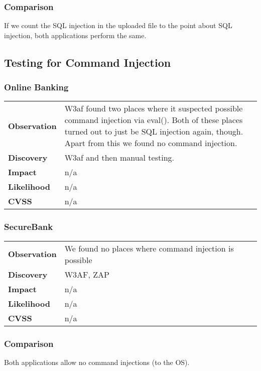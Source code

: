 \subsubsection*{Comparison}
If we count the SQL injection in the uploaded file to the point about SQL injection, both applications perform the same.

\clearpage


\subsection{Testing for Command Injection}

\subsubsection*{Online Banking}

\begin{tabular}{l|p{10cm}}
\textbf{Observation} & W3af found two places where it suspected possible command injection via eval(). Both of these places turned out to just be SQL injection again, though. Apart from this we found no command injection.\\
\textbf{Discovery} & W3af and then manual testing.\\
\textbf{Impact} & n/a \\
\textbf{Likelihood} & n/a \\
\textbf{CVSS} & n/a \\
\end{tabular}

\subsubsection*{SecureBank}

\begin{tabular}{l|p{10cm}}
\textbf{Observation} & We found no places where command injection is possible\\
\textbf{Discovery} & W3AF, ZAP\\
\textbf{Impact} & n/a \\
\textbf{Likelihood} & n/a \\
\textbf{CVSS} & n/a \\
\end{tabular}

\subsubsection*{Comparison}
Both applications allow no command injections (to the OS).


